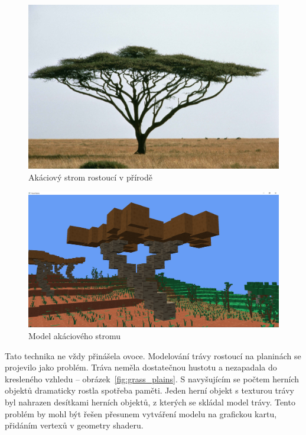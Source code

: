 \documentclass[thesis=M,czech]{FITthesis}[2019/12/23]
\begin{document}
\begin{figure}\centering
	\includegraphics[width=\textwidth]{images/acacia_nature}
	\caption[Akáciový strom rostoucí v přírodě]{Akáciový strom rostoucí v přírodě~\cite{acacia}}\label{fig:acacia_nature}
\end{figure}

\begin{figure}\centering
	\includegraphics[width=\textwidth]{images/acacia_engine}
	\caption[Model akáciového stromu]{Model akáciového stromu}\label{fig:acacia_engine}
\end{figure}

Tato technika ne vždy přinášela ovoce. Modelování trávy rostoucí na planinách se projevilo jako problém. Tráva neměla dostatečnou hustotu a nezapadala do kresleného vzhledu -- obrázek~\ref{fig:grass_plains}. S navyšujícím se počtem herních objektů dramaticky rostla spotřeba paměti. Jeden herní objekt s texturou trávy byl nahrazen desítkami herních objektů, z kterých se skládal model trávy. Tento problém by mohl být řešen přesunem vytváření modelu na grafickou kartu, přidáním vertexů v geometry shaderu.
\end{document}

